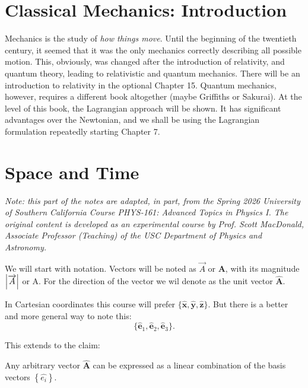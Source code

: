 \documentclass[../main.tex]{subfiles}
\begin{document}
\section{Classical Mechanics: Introduction}
Mechanics is the study of \textit{how things move}. Until the beginning of the twentieth century, it seemed that it was the only mechanics correctly describing all possible motion. This, obviously, was changed after the introduction of relativity, and quantum theory, leading to relativistic and quantum mechanics. There will be an introduction to relativity in the optional Chapter 15. Quantum mechanics, however, requires a different book altogether (maybe Griffiths or Sakurai). At the level of this book, the Lagrangian approach will be shown. It has significant advantages over the Newtonian, and we shall be using the Lagrangian formulation repeatedly starting Chapter 7.

\section{Space and Time}
\textit{Note: this part of the notes are adapted, in part, from the Spring 2026 University of Southern California Course PHYS-161: Advanced Topics in Physics I. The original content is developed as an experimental course by Prof. Scott MacDonald, Associate Professor (Teaching) of the USC Department of Physics and Astronomy.}

We will start with notation. Vectors will be noted as $\overrightarrow{A}$ or $\mathbf{A}$, with its magnitude $\vqty{\overrightarrow{A}}$ or $\mathrm{A}$. For the direction of the vector we wil denote as the unit vector $\mathbf{\hat{A}}$.

	\vspace{1\baselineskip}
	In Cartesian coordinates this course will prefer $\{\hat{\mathbf{x}}, \hat{\mathbf{y}}, \hat{\mathbf{z}}\}$. But there is a better and more general way to note this:
	\begin{equation}
	  \{\hat{\mathbf{e}}_1,\hat{\mathbf{e}}_2,\hat{\mathbf{e}}_3\}.
	\end{equation}

	This extends to the claim:
	\begin{claim}
		Any arbitrary vector $\hat{\mathbf{A}}$ can be expressed as a linear combination of the basis vectors $\left\{ \hat{e_{i}} \right\} $.
	\end{claim}
\end{document}
